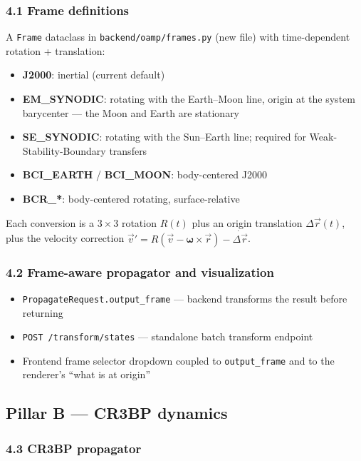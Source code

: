 \documentclass[11pt, a4paper]{article}
\begin{document}
\subsubsection{4.1 Frame definitions}

A \texttt{Frame} dataclass in \texttt{backend/oamp/frames.py} (new file)
with time-dependent rotation + translation:

\begin{itemize}[leftmargin=*]
  \item \textbf{J2000}: inertial (current default)
  \item \textbf{EM\_SYNODIC}: rotating with the Earth--Moon line, origin at
        the system barycenter --- the Moon and Earth are stationary
  \item \textbf{SE\_SYNODIC}: rotating with the Sun--Earth line; required
        for Weak-Stability-Boundary transfers
  \item \textbf{BCI\_EARTH} / \textbf{BCI\_MOON}: body-centered J2000
  \item \textbf{BCR\_*}: body-centered rotating, surface-relative
\end{itemize}

Each conversion is a $3{\times}3$ rotation $R(t)$ plus an origin
translation $\Delta\vec r(t)$, plus the velocity correction
$\vec v' = R(\vec v - \boldsymbol\omega \times \vec r) - \dot{\Delta\vec r}$.

\subsubsection{4.2 Frame-aware propagator and visualization}

\begin{itemize}[leftmargin=*]
  \item \texttt{PropagateRequest.output\_frame} --- backend transforms the
        result before returning
  \item \texttt{POST /transform/states} --- standalone batch transform
        endpoint
  \item Frontend frame selector dropdown coupled to \texttt{output\_frame}
        and to the renderer's ``what is at origin''
\end{itemize}

\subsection{Pillar B --- CR3BP dynamics}

\subsubsection{4.3 CR3BP propagator}
\end{document}
